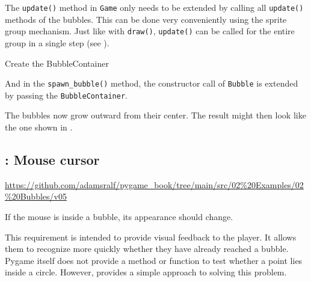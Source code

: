 
The \texttt{update()} method in \texttt{Game} only needs to be extended by calling all \texttt{update()} methods of the bubbles. This can be done very conveniently using the sprite group mechanism. Just like with \texttt{draw()}, \texttt{update()} can be called for the entire group in a single step (see ).


Create the BubbleContainer


And in the \texttt{spawn\_bubble()} method, the constructor call of \texttt{Bubble} is extended by passing the \texttt{BubbleContainer}.


The bubbles now grow outward from their center. The result might then look like the one shown in .


\newpage
\subsection{: Mouse cursor}
\begin{diskbox}
	\url{https://github.com/adamsralf/pygame_book/tree/main/src/02%20Examples/02%20Bubbles/v05}
\end{diskbox}

	If the mouse is inside a bubble, its appearance should change.
\er

This requirement is intended to provide visual feedback to the player. It allows them to recognize more quickly whether they have already reached a bubble. Pygame itself does not provide a method or function to test whether a point lies inside a circle. However,  provides a simple approach to solving this problem.

